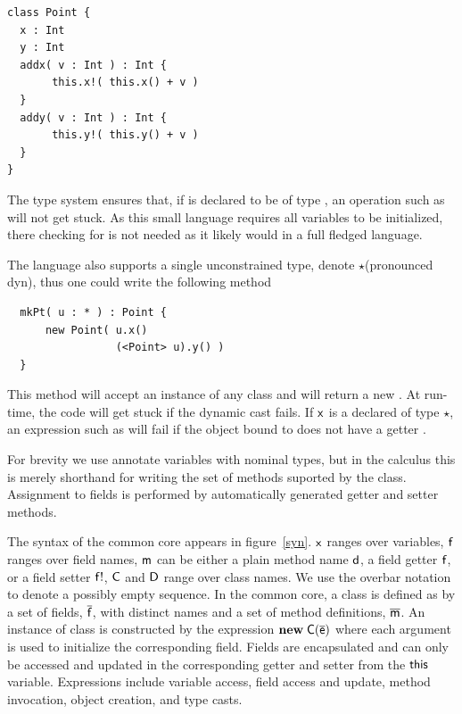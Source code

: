 \documentclass[preprint]{sigplanconf}
\newcommand{\m}{\M{\xt{m}}}
\newcommand{\e}{\M{\xt{e}}}
\renewcommand{\d}{\M{\xt{d}}}
\newcommand{\f}{\M{\xt{f}}}
\newcommand{\fb}{\M{\xt{f!}}}
\newcommand{\x}{\M{\xt{x}}}
\newcommand{\C}{\M{\xt{C}}}
\newcommand{\D}{\M{\xt{D}}}
\newcommand{\this}{\M{\xt{this}}}
\renewcommand{\d}{\M{\xt{d}}}
\newcommand{\new}{\M{\bt{new}}}
\newcommand{\New}[2]{\M{\new\;#1({#2})}}
\newcommand{\Cast}[2]{\M{\langle{#1}\rangle{#2}}}
\newcommand{\any}{\M{\star}}
\newcommand{\M}[1]{\ensuremath{#1}\xspace}
\newcommand{\xt}[1]{{\sf{#1}}\xspace}
\newcommand{\bt}[1]{\xt{\bf #1}}
\renewcommand{\b}[1]{\M{\overline{#1}}}
\begin{document}
\begin{verbatim}
class Point {
  x : Int
  y : Int
  addx( v : Int ) : Int {
       this.x!( this.x() + v )
  }
  addy( v : Int ) : Int {
       this.y!( this.y() + v )
  }
}
\end{verbatim}

The type system ensures that, if \xt{pt} is declared to be of type
\xt{Point}, an operation such as \xt{pt.addx(42)} will not get stuck.  As
this small language requires all variables to be initialized, there checking
for \xt{null} is not needed as it likely would in a full fledged language.

The language also supports a single unconstrained type, denote \any (pronounced
dyn), thus one could write the following method

\begin{verbatim}
  mkPt( u : * ) : Point {
      new Point( u.x() 
                 (<Point> u).y() )
  }
\end{verbatim}

This method will accept an instance of any class and will return a new
\xt{Point}. At run-time, the code will get stuck if the dynamic cast
\xt{\Cast{\xt{Point}}{\xt{u}}} fails. If \x is a declared of type \any, an
expression such as \xt{u.x()} will fail if the object bound to \xt{u} does
not have a getter \xt{x()}.


For brevity we use annotate variables with nominal types, but in the
calculus this is merely shorthand for writing the set of methods suported 
by the class. Assignment to fields is performed by automatically generated
getter and setter methods.

The syntax of the common core appears in figure~\ref{syn}.  \x ranges
over variables, \f ranges over field names, \m can be either a plain method
name \d, a field getter \f, or a field setter \fb, \C and \D range over
class names. We use the overbar notation to denote a possibly empty
sequence. In the common core, a class is defined as by a set of fields,
\b\f, with distinct names and a set of method definitions, \b\m. An instance
of class is constructed by the expression \New\C{\b\e} where each argument
is used to initialize the corresponding field. Fields are encapsulated and
can only be accessed and updated in the corresponding getter and setter from
the \this variable.  Expressions include variable access, field access and
update, method invocation, object creation, and type casts.
\end{document}
